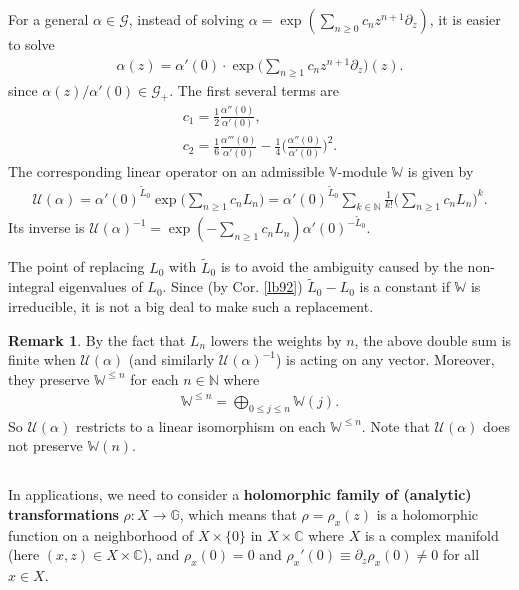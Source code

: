 \documentclass[12pt,a4paper,notitlepage]{article}
\theoremstyle{definition}
\newtheorem{rem}[df]{Remark}
\theoremstyle{plain}
\newcommand{\mc}{\mathcal}
\newcommand{\wtd}{\widetilde}
\newcommand{\blt}{\bullet}
\newcommand{\Vbb}{\mathbb V}
\newcommand{\Wbb}{\mathbb W}
\newcommand{\Gbb}{\mathbb G}
\newcommand{\Cbb}{\mathbb C}
\newcommand{\Nbb}{\mathbb N}
\numberwithin{equation}{section}
\begin{document}
For a general $\alpha\in\mc G$, instead of solving $\alpha=\exp(\sum_{n\geq 0}c_n z^{n+1}\partial_z)$, it is easier to solve
\begin{align}
\alpha(z)=\alpha'(0)\cdot \exp\Big(\sum_{n\geq 1} c_nz^{n+1}\partial_z\Big)(z).	
\end{align}
since $\alpha(z)/\alpha'(0)\in\mc G_+$. The first several terms are
\begin{subequations}
\begin{gather}
c_1=\frac 12\frac{\alpha''(0)}{\alpha'(0)},\\
c_2=\frac 16\frac{\alpha'''(0)}{\alpha'(0)}-\frac 14\Big(\frac{\alpha''(0)}{\alpha'(0)}\Big)^2.
\end{gather}
\end{subequations}
The corresponding linear operator on an admissible $\Vbb$-module $\Wbb$ is given by \index{U@$\mc U(\alpha),\mc U(\eta),\mc U(\eta_\blt)$}
\begin{align}
\mc U(\alpha)=\alpha'(0)^{\wtd L_0}\exp\Big(\sum_{n\geq1} c_nL_n\Big)=	\alpha'(0)^{\wtd L_0}\sum_{k\in\Nbb}\frac 1{k!}\Big(\sum_{n\geq 1}c_n L_n\Big)^k.\label{eq192}
\end{align}
Its inverse is $\mc U(\alpha)^{-1}=\exp(-\sum_{n\geq 1}c_nL_n)\alpha'(0)^{-\wtd L_0}$.

The point of replacing $L_0$ with $\wtd L_0$  is to avoid the ambiguity caused by the non-integral eigenvalues of $L_0$. Since (by Cor. \ref{lb92}) $\wtd L_0-L_0$ is a constant if $\Wbb$ is irreducible,  it is not a big deal to make such a replacement.


\begin{rem}
By the fact that $L_n$ lowers the weights by $n$, the  above double sum is finite when $\mc U(\alpha)$ (and similarly $\mc U(\alpha)^{-1}$) is acting on any vector. Moreover, they preserve $\Wbb^{\leq n}$ for each $n\in\Nbb$ where \index{W@$\Wbb^{\leq n}$}
\begin{align}
\Wbb^{\leq n}=\bigoplus_{0\leq j\leq n}\Wbb(j).	
\end{align}
So $\mc U(\alpha)$ restricts to a linear isomorphism on each $\Wbb^{\leq n}$. Note that $\mc U(\alpha)$ does not preserve $\Wbb(n)$.
\end{rem}




\subsection{}\label{lb97}


In applications, we need to consider a \textbf{holomorphic family of (analytic) transformations}   $\rho:X\rightarrow\Gbb$, which means that $\rho=\rho_x(z)$ is a holomorphic function on a neighborhood of $X\times \{0\}$ in $X\times\Cbb$ where $X$ is a complex manifold (here $(x,z)\in X\times \Cbb$), and $\rho_x(0)=0$ and $\rho_x'(0)\equiv\partial_z\rho_x(0)\neq0$ for all $x\in X$.  
\end{document}
